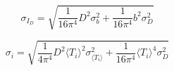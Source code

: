 \documentclass{article}
\begin{document}
\[
  \sigma_{I_{D}} = \sqrt{\frac{1}{16\pi^{4}} D^{2} \sigma_{b}^{2} + \frac{1}{16\pi^{4}} b^{2} \sigma_{D}^{2}}
\]

\[
	\sigma_{i} = \sqrt{\frac{1}{4\pi^{4}} D^{2} \langle T_{i}\rangle^{2} \sigma_{\langle T_{i}\rangle}^{2} + \frac{1}{16\pi^{4}} \langle T_{i}\rangle^{4} \sigma_{D}^{2}}
\]
\end{document}
